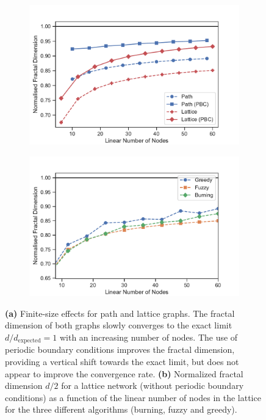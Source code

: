 \documentclass[9pt,onecolumn,twoside]{pnas-new}
\begin{document}
\begin{figure}
    \centering
\begin{subfigure}{.5\textwidth}
    \centering
    \includegraphics[width=\columnwidth]{images/fse.pdf}
    \caption{}
    \label{fig:fse}
\end{subfigure}%
\begin{subfigure}{.5\textwidth}
    \centering
    \includegraphics[width=\columnwidth]{images/fse_comparison.pdf}
    \caption{}
    \label{fig:algos}
\end{subfigure}
    \caption{\textbf{(a)} Finite-size effects for path and lattice graphs. The fractal dimension of both graphs slowly converges to the exact limit $d/d_\text{expected} = 1$ with an increasing number of nodes. The use of periodic boundary conditions improves the fractal dimension, providing a vertical shift towards the exact limit, but does not appear to improve the convergence rate. \textbf{(b)} Normalized fractal dimension $d/2$ for a lattice network (without periodic boundary conditions) as a function of the linear number of nodes in the lattice for the three different algorithms (burning, fuzzy and greedy).}
    \label{fig:fseALL}
\end{figure}
\end{document}
